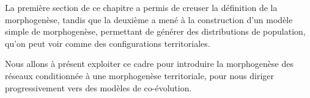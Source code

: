 \stars


La première section de ce chapitre a permis de creuser la définition de la morphogenèse, tandis que la deuxième a mené à la construction d'un modèle simple de morphogenèse, permettant de générer des distributions de population, qu'on peut voir comme des configurations territoriales.

Nous allons à présent exploiter ce cadre pour introduire la morphogenèse des réseaux conditionnée à une morphogenèse territoriale, pour nous diriger progressivement vers des modèles de co-évolution.


\stars






